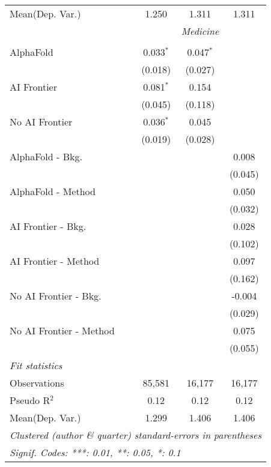 \begin{tabular}{lccc}
Mean(Dep. Var.) & 1.250 & 1.311 & 1.311 \\
 & \multicolumn{3}{c}{\textit{Medicine}} \\ \\
   AlphaFold               & 0.033$^{*}$ & 0.047$^{*}$ &   \\   
                           & (0.018)     & (0.027)     &   \\   
   AI Frontier             & 0.081$^{*}$ & 0.154       &   \\   
                           & (0.045)     & (0.118)     &   \\   
   No AI Frontier          & 0.036$^{*}$ & 0.045       &   \\   
                           & (0.019)     & (0.028)     &   \\   
   AlphaFold - Bkg.        &             &             & 0.008\\   
                           &             &             & (0.045)\\   
   AlphaFold - Method      &             &             & 0.050\\   
                           &             &             & (0.032)\\   
   AI Frontier - Bkg.      &             &             & 0.028\\   
                           &             &             & (0.102)\\   
   AI Frontier - Method    &             &             & 0.097\\   
                           &             &             & (0.162)\\   
   No AI Frontier - Bkg.   &             &             & -0.004\\   
                           &             &             & (0.029)\\   
   No AI Frontier - Method &             &             & 0.075\\   
                           &             &             & (0.055)\\   
   \midrule
   \emph{Fit statistics}\\
   Observations            & 85,581      & 16,177      & 16,177\\  
   Pseudo R$^2$            & 0.12        & 0.12        & 0.12\\  
Mean(Dep. Var.) & 1.299 & 1.406 & 1.406 \\
   \midrule \midrule
   \multicolumn{4}{l}{\emph{Clustered (author \& quarter) standard-errors in parentheses}}\\
   \multicolumn{4}{l}{\emph{Signif. Codes: ***: 0.01, **: 0.05, *: 0.1}}\\
\end{tabular}
\par\endgroup
